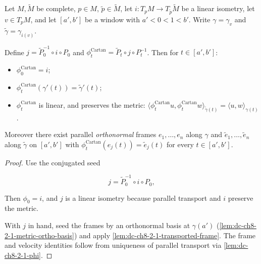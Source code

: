 \begin{lemma}
  \label{lem:dc-ch8-2-1-cartan-frame-data}


  Let $M,\tilde M$ be complete, $p\in M$, $\tilde p\in\tilde M$, let $i:T_pM\to T_{\tilde p}\tilde
  M$ be a linear isometry, let $v\in T_pM$, and let $[a',b']$ be a window with $a'<0<1<b'$. Write
  $\gamma=\gamma_v$ and $\tilde\gamma=\gamma_{i(v)}$.

  Define $j=\tilde P_0^{-1}\circ i\circ P_0$ and
  $\phi^{\mathrm{Cartan}}_t=\tilde P_t\circ j\circ P_t^{-1}$. Then for
  $t\in[a',b']$:
  \begin{itemize}
    \item $\phi^{\mathrm{Cartan}}_0=i$;
    \item $\phi^{\mathrm{Cartan}}_t(\gamma'(t))=\tilde\gamma'(t)$;
    \item $\phi^{\mathrm{Cartan}}_t$ is linear, and preserves the metric:
      $\langle\phi^{\mathrm{Cartan}}_tu,\phi^{\mathrm{Cartan}}_tw\rangle_{\tilde\gamma(t)}
      =\langle u,w\rangle_{\gamma(t)}$.
  \end{itemize}
  Moreover there exist parallel \emph{orthonormal} frames $e_1,\dots,e_n$ along $\gamma$ and
  $\tilde e_1,\dots,\tilde e_n$ along $\tilde\gamma$ on $[a',b']$ with
  $\phi^{\mathrm{Cartan}}_t(e_j(t))=\tilde e_j(t)$ for every $t\in[a',b']$.
\end{lemma}
\begin{proof}

\sketch
  Use the conjugated seed

  $$
  j=\tilde P_0^{-1}\circ i\circ P_0 ,
  $$

  Then $\phi_0=i$, and $j$ is a linear isometry because parallel transport and $i$
  preserve the metric.

  With $j$ in hand, seed the frames by an orthonormal basis at $\gamma(a')$
  (\cref{lem:dc-ch8-2-1-metric-ortho-basis}) and apply
  \cref{lem:dc-ch8-2-1-transported-frame}. The frame and velocity identities follow from
  uniqueness of parallel transport via \cref{lem:dc-ch8-2-1-phi}.
\end{proof}

